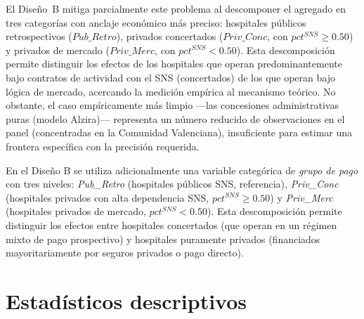El Diseño~B mitiga parcialmente este problema al descomponer el agregado en tres categorías con anclaje económico más preciso: hospitales públicos retrospectivos ($Pub\_Retro$), privados concertados ($Priv\_Conc$, con $pct^{SNS} \geq 0.50$) y privados de mercado ($Priv\_Merc$, con $pct^{SNS} < 0.50$). Esta descomposición permite distinguir los efectos de los hospitales que operan predominantemente bajo contratos de actividad con el SNS (concertados) de los que operan bajo lógica de mercado, acercando la medición empírica al mecanismo teórico. No obstante, el caso empíricamente más limpio ---las concesiones administrativas puras (modelo Alzira)--- representa un número reducido de observaciones en el panel (concentradas en la Comunidad Valenciana), insuficiente para estimar una frontera específica con la precisión requerida.

En el Diseño B se utiliza adicionalmente una variable categórica de \textit{grupo de pago} con tres niveles: \textit{Pub\_Retro} (hospitales públicos SNS, referencia), \textit{Priv\_Conc} (hospitales privados con alta dependencia SNS, $pct^{SNS}\geq 0.50$) y \textit{Priv\_Merc} (hospitales privados de mercado, $pct^{SNS}<0.50$). Esta descomposición permite distinguir los efectos entre hospitales concertados (que operan en un régimen mixto de pago prospectivo) y hospitales puramente privados (financiados mayoritariamente por seguros privados o pago directo).

\section{Estadísticos descriptivos}

